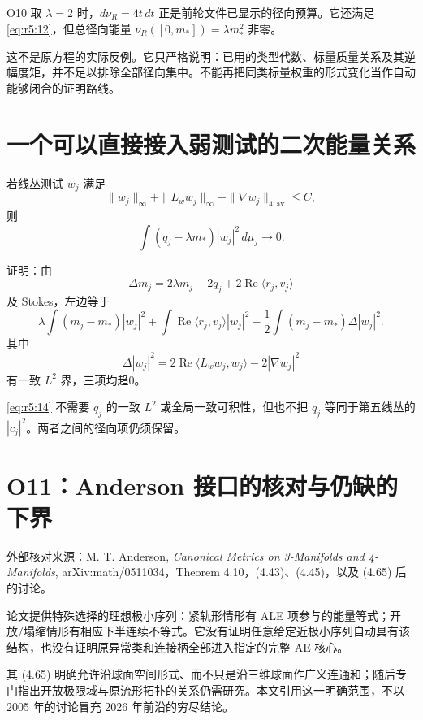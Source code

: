 \documentclass[UTF8,11pt,fontset=none]{ctexart}
\begin{document}
O10 取 \(\lambda=2\) 时，\(d\nu_R=4t\,dt\) 正是前轮文件已显示的径向预算。它还满足 \eqref{eq:r5:12}，但总径向能量 \(\nu_R([0,m_*])=\lambda m_*^2\) 非零。

这不是原方程的实际反例。它只严格说明：已用的类型代数、标量质量关系及其逆幅度矩，并不足以排除全部径向集中。不能再把同类标量权重的形式变化当作自动能够闭合的证明路线。

\section{一个可以直接接入弱测试的二次能量关系}\label{ch5:ux4e00ux4e2aux53efux4ee5ux76f4ux63a5ux63a5ux5165ux5f31ux6d4bux8bd5ux7684ux4e8cux6b21ux80fdux91cfux5173ux7cfb}

若线丛测试 \(w_j\) 满足 \[
 \|w_j\|_\infty+\|L_ww_j\|_\infty
 +\|\nabla w_j\|_{4,\mathrm{av}}\le C,
\] 则 \[
 \boxed{
 \int(q_j-\lambda m_*)|w_j|^2\,d\mu_j\longrightarrow0.
 }
\tag{5.14}\label{eq:r5:14}
\]

证明：由 \[
 \Delta m_j=2\lambda m_j-2q_j
       +2\operatorname{Re}\langle r_j,v_j\rangle
\] 及 Stokes，左边等于 \[
 \lambda\int(m_j-m_*)|w_j|^2
 +\int\operatorname{Re}\langle r_j,v_j\rangle|w_j|^2
 -\frac12\int(m_j-m_*)\Delta|w_j|^2.
\] 其中 \[
 \Delta|w_j|^2
 =2\operatorname{Re}\langle L_ww_j,w_j\rangle
       -2|\nabla w_j|^2
\] 有一致 \(L^2\) 界，三项均趋0。

\eqref{eq:r5:14} 不需要 \(q_j\) 的一致 \(L^2\) 或全局一致可积性，但也不把 \(q_j\) 等同于第五线丛的 \(|c_j|^2\)。两者之间的径向项仍须保留。

\section{O11：Anderson 接口的核对与仍缺的下界}\label{ch5:o11anderson-ux63a5ux53e3ux7684ux6838ux5bf9ux4e0eux4ecdux7f3aux7684ux4e0bux754c}

外部核对来源：M. T. Anderson, \emph{Canonical Metrics on 3-Manifolds and 4-Manifolds}, arXiv:math/0511034，Theorem 4.10，(4.43)、(4.45)，以及 (4.65) 后的讨论。

论文提供特殊选择的理想极小序列：紧轨形情形有 ALE 项参与的能量等式；开放/塌缩情形有相应下半连续不等式。它没有证明任意给定近极小序列自动具有该结构，也没有证明原异常类和连接柄全部进入指定的完整 AE 核心。

其 (4.65) 明确允许沿球面空间形式、而不只是沿三维球面作广义连通和；随后专门指出开放极限域与原流形拓扑的关系仍需研究。本文引用这一明确范围，不以 2005 年的讨论冒充 2026 年前沿的穷尽结论。
\end{document}
